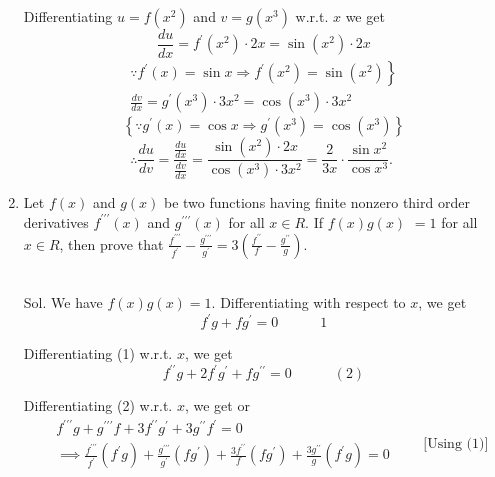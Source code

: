 \begin{enumerate}
 \begin{outline}
     Differentiating $u=f\left(x^2\right)$ and $v=g\left(x^3\right)$ w.r.t. $x$ we get
$$
\frac{d u}{d x}=f^{\prime}\left(x^2\right)\cdot 2 x=\sin \left(x^2\right) \cdot 2 x
$$
$$
\begin{gathered}
\left.\because f^{\prime}(x)=\sin x \Rightarrow f^{\prime}\left(x^2\right)=\sin \left(x^2\right)\right\} \\
\frac{d v}{d x}=g^{\prime}\left(x^3\right) \cdot 3 x^2=\cos \left(x^3\right) \cdot 3 x^2
\end{gathered}
$$
$$
\left\{\because g^{\prime}(x)=\cos x \Rightarrow g^{\prime}\left(x^3\right)=\cos \left(x^3\right)\right\}
$$
$$
\therefore \frac{d u}{d v}=\frac{\frac{d u}{d x}}{\frac{d v}{d x}}=\frac{\sin \left(x^2\right) \cdot 2 x}{\cos \left(x^3\right) \cdot 3 x^2}=\frac{2}{3 x} \cdot \frac{\sin x^2}{\cos x^3} \text {. }
$$


 \end{outline}

\item Let $f(x)$ and $g(x)$ be two functions having finite nonzero third order derivatives $f^{\prime \prime \prime}(x)$ and $g^{\prime \prime \prime}(x)$ for all $x \in R$. If $f(x) g(x)$ $=1$ for all $x \in R$, then prove that $\frac{f^{\prime \prime \prime}}{f^{\prime}}-\frac{g^{\prime \prime \prime}}{g^{\prime}}=3\left(\frac{f^{\prime \prime}}{f}-\frac{g^{\prime \prime}}{g}\right)$.\\\\



\begin{outline}
    Sol. We have $f(x) g(x)=1$. Differentiating with respect to $x$, we get
$$
f^{\prime} g+f g^{\prime}=0
 \quad \quad \quad 1$$

Differentiating (1) w.r.t. $x$, we get
$$
f^{\prime \prime} g+2 f^{\prime} g^{\prime}+f g^{\prime \prime}=0
\quad \quad \quad (2)$$

Differentiating (2) w.r.t. $x$, we get
or
$$
\begin{aligned}
& f^{\prime \prime \prime} g+g^{\prime \prime \prime} f+3 f^{\prime \prime} g^{\prime}+3 g^{\prime \prime} f^{\prime}=0 \\
& \implies \frac{f^{\prime \prime \prime}}{f^{\prime}}\left(f^\prime g\right)+\frac{g^{\prime \prime \prime}}{g^{\prime}}\left(f g^\prime\right)+\frac{3 f^{\prime \prime}}{f}\left(fg^{\prime} \right)+\frac{3 g^{\prime \prime}}{g}\left(f^\prime g\right)=0
\end{aligned}
 \quad \quad \text{[Using (1)]}$$


\end{outline}
\end{enumerate}
